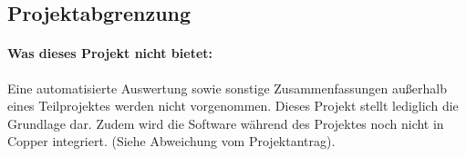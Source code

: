 \subsection{Projektabgrenzung} 
\label{sec:Projektabgrenzung}

\paragraph*{Was dieses Projekt nicht bietet: } Eine automatisierte Auswertung sowie sonstige Zusammenfassungen außerhalb eines Teilprojektes werden nicht vorgenommen. Dieses Projekt stellt lediglich die Grundlage dar. Zudem wird die Software während des Projektes noch nicht in Copper integriert. (Siehe Abweichung vom Projektantrag).